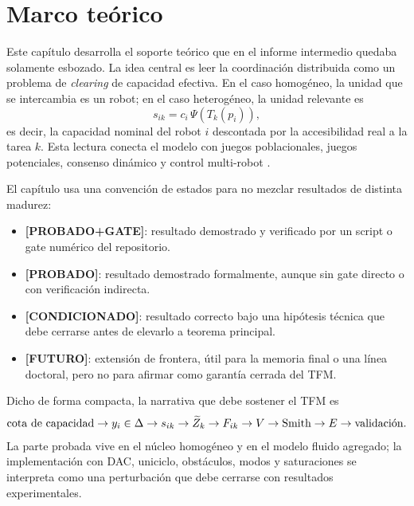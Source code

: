 \section{Marco teórico}
\label{sec:marco}

Este capítulo desarrolla el soporte teórico que en el informe intermedio quedaba
solamente esbozado. La idea central es leer la coordinación distribuida como un
problema de \emph{clearing} de capacidad efectiva. En el caso homogéneo, la unidad que
se intercambia es un robot; en el caso heterogéneo, la unidad relevante es
\[
  s_{ik}=c_i\,\Psi(T_k(p_i)),
\]
es decir, la capacidad nominal del robot $i$ descontada por la accesibilidad real a la
tarea $k$. Esta lectura conecta el modelo con juegos poblacionales, juegos potenciales,
consenso dinámico y control multi-robot \citep{sandholm2010population,
quijano2017population,barreiro2017distributed,kia2019tutorial,bullo2009distributed}.

El capítulo usa una convención de estados para no mezclar resultados de distinta
madurez:
\begin{itemize}
  \item \textbf{[PROBADO+GATE]}: resultado demostrado y verificado por un script o gate
  numérico del repositorio.
  \item \textbf{[PROBADO]}: resultado demostrado formalmente, aunque sin gate directo o
  con verificación indirecta.
  \item \textbf{[CONDICIONADO]}: resultado correcto bajo una hipótesis técnica que debe
  cerrarse antes de elevarlo a teorema principal.
  \item \textbf{[FUTURO]}: extensión de frontera, útil para la memoria final o una línea
  doctoral, pero no para afirmar como garantía cerrada del TFM.
\end{itemize}

Dicho de forma compacta, la narrativa que debe sostener el TFM es
\[
  \text{cota de capacidad}
  \rightarrow y_i\in\Delta
  \rightarrow s_{ik}
  \rightarrow \widetilde{Z}_k
  \rightarrow F_{ik}
  \rightarrow V
  \rightarrow \text{Smith}
  \rightarrow E
  \rightarrow \text{validación}.
\]
La parte probada vive en el núcleo homogéneo y en el modelo fluido agregado; la
implementación con DAC, uniciclo, obstáculos, modos y saturaciones se interpreta como
una perturbación que debe cerrarse con resultados experimentales.


